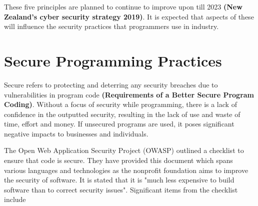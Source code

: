 \par These five principles are planned to continue to improve upon till 2023 \textbf{(New Zealand’s cyber security strategy 2019)}. It is expected that aspects of these will influence the security practices that programmers use in industry. 

\section{Secure Programming Practices}

Secure refers to protecting and deterring any security breaches due to vulnerabilities in program code \textbf{(Requirements of a Better Secure Program Coding)}. Without a focus of security while programming, there is a lack of confidence in the outputted security, resulting in the lack of use and waste of time, effort and money. If unsecured programs are used, it poses significant negative impacts to businesses and individuals. 
\newline
\par The Open Web Application Security Project (OWASP) outlined a checklist to ensure that code is secure. They have provided this document which spans various languages and technologies as the nonprofit foundation aims to improve the security of software. It is stated that it is "much less expensive to build software than to correct security issues". %
\newline
\newline
Significant items from the checklist include%

